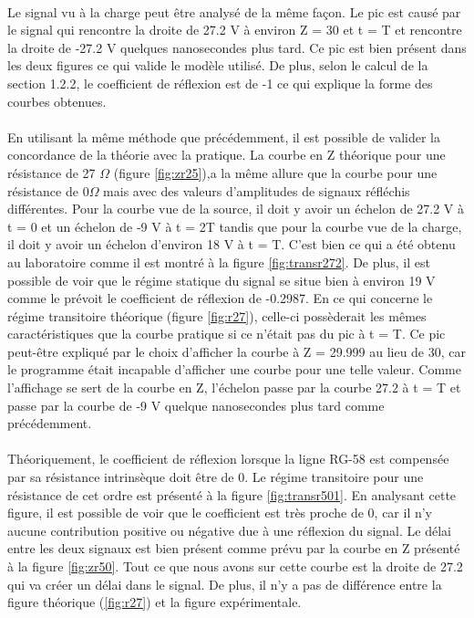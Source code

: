 \paragraph{}Le signal vu à la charge peut être analysé de la même façon. Le pic est causé par le signal qui rencontre la droite de 27.2 V à environ Z = 30 et t = T et rencontre la droite de -27.2 V quelques nanosecondes plus tard. Ce pic est bien présent dans les deux figures ce qui valide le modèle utilisé. De plus, selon le calcul de la section 1.2.2, le coefficient de réflexion est de -1 ce qui explique la forme des courbes obtenues.

\paragraph{} En utilisant la même méthode que précédemment, il est possible de valider la concordance de la théorie avec la pratique. La courbe en Z théorique pour une résistance de 27 $\Omega$ (figure \ref{fig:zr25}),a la même allure que la courbe pour une résistance de $0\Omega$ mais avec des valeurs d'amplitudes de signaux réfléchis différentes. Pour la courbe vue de la source, il doit y avoir un échelon de 27.2 V à t = 0 et un échelon de -9 V à t = 2T tandis que pour la courbe vue de la charge, il doit y avoir un échelon d'environ 18 V à t = T. C'est bien ce qui a été obtenu au laboratoire comme il est montré à la figure \ref{fig:transr272}. De plus, il est possible de voir que le régime statique du signal se situe bien à environ 19 V comme le prévoit le coefficient de réflexion de -0.2987. En ce qui concerne le régime transitoire théorique (figure \ref{fig:r27}), celle-ci possèderait les mêmes caractéristiques que la courbe pratique si ce n'était pas du pic à t = T. Ce pic peut-être expliqué par le choix d'afficher la courbe à Z = 29.999 au lieu de 30, car le programme était incapable d'afficher une courbe pour une telle valeur. Comme l'affichage se sert de la courbe en Z, l'échelon passe par la courbe 27.2 à t = T et passe par la courbe de -9 V quelque nanosecondes plus tard comme précédemment.

\paragraph{} Théoriquement, le coefficient de réflexion lorsque la ligne RG-58 est compensée par sa résistance intrinsèque doit être de 0. Le régime transitoire pour une résistance de cet ordre est présenté à la figure \ref{fig:transr501}. En analysant cette figure, il est possible de voir que le coefficient est très proche de 0, car il n'y aucune contribution positive ou négative due à une réflexion du signal. Le délai entre les deux signaux est bien présent comme prévu par la courbe en Z présenté à la figure \ref{fig:zr50}. Tout ce que nous avons sur cette courbe est la droite de 27.2 qui va créer un délai dans le signal. De plus, il n'y a pas de différence entre la figure théorique (\ref{fig:r27}) et la figure expérimentale.

